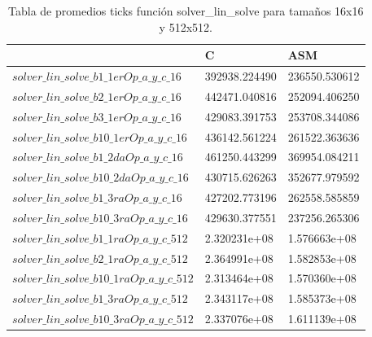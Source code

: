 \begin{table}[htbp]
\begin{center}
\begin{tabular}{|l|l|l|}
\hline
  & C & ASM\\
\hline \hline
$solver\_lin\_solve\_b1\_1erOp\_a\_y\_c\_16$ & 392938.224490 & 236550.530612\\ \hline

$solver\_lin\_solve\_b2\_1erOp\_a\_y\_c\_16$ & 442471.040816 & 252094.406250\\ \hline

$solver\_lin\_solve\_b3\_1erOp\_a\_y\_c\_16$ & 429083.391753 & 253708.344086\\ \hline

$solver\_lin\_solve\_b10\_1erOp\_a\_y\_c\_16$ & 436142.561224  & 261522.363636\\ \hline


$solver\_lin\_solve\_b1\_2daOp\_a\_y\_c\_16$ & 461250.443299 & 369954.084211\\ \hline

$solver\_lin\_solve\_b10\_2daOp\_a\_y\_c\_16$ & 430715.626263 & 352677.979592\\ \hline

$solver\_lin\_solve\_b1\_3raOp\_a\_y\_c\_16$ & 427202.773196  & 262558.585859\\ \hline


$solver\_lin\_solve\_b10\_3raOp\_a\_y\_c\_16$ & 429630.377551    & 237256.265306\\ \hline

\hline \hline 


$solver\_lin\_solve\_b1\_1raOp\_a\_y\_c\_512$ & 2.320231e+08  & 1.576663e+08\\ \hline

$solver\_lin\_solve\_b2\_1raOp\_a\_y\_c\_512$ & 2.364991e+08  &  1.582853e+08\\ \hline

$solver\_lin\_solve\_b10\_1raOp\_a\_y\_c\_512$ & 2.313464e+08   &  1.570360e+08\\ \hline

$solver\_lin\_solve\_b1\_3raOp\_a\_y\_c\_512$ & 2.343117e+08  & 1.585373e+08\\ \hline

$solver\_lin\_solve\_b10\_3raOp\_a\_y\_c\_512$ & 2.337076e+08 & 1.611139e+08\\ \hline

\end{tabular}
\caption{Tabla de promedios ticks función solver\_lin\_solve para tamaños 16x16 y 512x512.}
\end{center}
\end{table}
